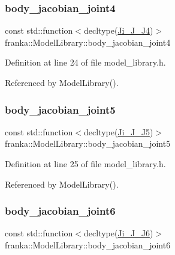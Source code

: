 \subsubsection{\texorpdfstring{body\+\_\+jacobian\+\_\+joint4}{body\_jacobian\_joint4}}
{\footnotesize\ttfamily const std\+::function$<$decltype(\hyperlink{libfcimodels_8h_a6145cbfc0cfbc5f7802736cc1469a9d1}{Ji\+\_\+\+J\+\_\+\+J4})$>$ franka\+::\+Model\+Library\+::body\+\_\+jacobian\+\_\+joint4}



Definition at line 24 of file model\+\_\+library.\+h.



Referenced by Model\+Library().

\mbox{\label{classfranka_1_1ModelLibrary_a2815fbfeaeb50ec8688bdff85152c7d9}} 
\subsubsection{\texorpdfstring{body\+\_\+jacobian\+\_\+joint5}{body\_jacobian\_joint5}}
{\footnotesize\ttfamily const std\+::function$<$decltype(\hyperlink{libfcimodels_8h_a2f89fffd684c249a4ea299f31c35fe8c}{Ji\+\_\+\+J\+\_\+\+J5})$>$ franka\+::\+Model\+Library\+::body\+\_\+jacobian\+\_\+joint5}



Definition at line 25 of file model\+\_\+library.\+h.



Referenced by Model\+Library().

\mbox{\label{classfranka_1_1ModelLibrary_a8191423f0e4cf4b9048c121ba88db030}} 
\subsubsection{\texorpdfstring{body\+\_\+jacobian\+\_\+joint6}{body\_jacobian\_joint6}}
{\footnotesize\ttfamily const std\+::function$<$decltype(\hyperlink{libfcimodels_8h_ae2da204ec27343da7d9ad472376a77aa}{Ji\+\_\+\+J\+\_\+\+J6})$>$ franka\+::\+Model\+Library\+::body\+\_\+jacobian\+\_\+joint6}



